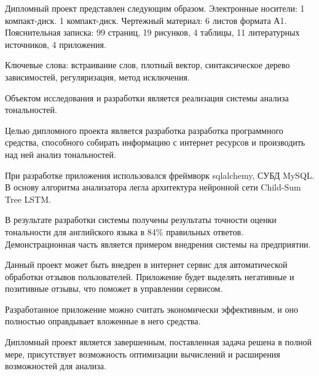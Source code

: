 \thispagestyle{empty}

Дипломный проект представлен следующим образом. Электронные носители: 1 компакт-диск. 1 компакт-диск. Чертежный материал: 6 листов формата А1. Пояснительная записка: 99 страниц, 19 рисунков, 4 таблицы, 11 литературных источников, 4 приложения.

Ключевые слова: встраивание слов, плотный вектор, синтаксическое дерево зависимостей, регуляризация, метод исключения.

Объектом исследования и разработки является реализация системы анализа тональностей.

Целью дипломного проекта является разработка разработка программного средства, способного собирать информацию с интернет ресурсов и производить над ней анализ тональностей.

При разработке приложения использовался фреймворк sqlalchemy, СУБД MySQL\@. В основу алгоритма анализатора легла архитектура нейронной сети Child-Sum Tree LSTM\@.

В результате разработки системы получены результаты точности оценки тональности для английского языка в 84\% правильных ответов. Демонстрационная часть является примером внедрения системы на предприятии.

Данный проект может быть внедрен в интернет сервис для автоматической обработки отзывов пользователей. Приложение будет выделять негативные и позитивные отзывы, что поможет в управлении сервисом.

Разработанное приложение можно считать экономически эффективным, и оно полностью оправдывает вложенные в него средства.

Дипломный проект является завершенным, поставленная задача решена в полной мере, присутствует возможность оптимизации вычислений и расширения возможностей для анализа.

\clearpage
